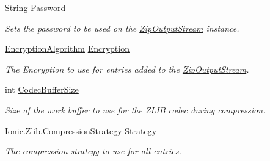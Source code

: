 \begin{DoxyCompactItemize}
\item 
String \mbox{\hyperlink{class_super_tiled2_unity_1_1_ionic_1_1_zip_1_1_zip_output_stream_a574733e2d7d17252b7d89f966d588eb9}{Password}}
\begin{DoxyCompactList}\small\item\em Sets the password to be used on the {\ttfamily \mbox{\hyperlink{class_super_tiled2_unity_1_1_ionic_1_1_zip_1_1_zip_output_stream}{Zip\+Output\+Stream}}} instance. \end{DoxyCompactList}\item 
\mbox{\hyperlink{namespace_super_tiled2_unity_1_1_ionic_1_1_zip_aa3f4e8aa12ef827ac72177a49b4e28e6}{Encryption\+Algorithm}} \mbox{\hyperlink{class_super_tiled2_unity_1_1_ionic_1_1_zip_1_1_zip_output_stream_af1e123174110807666b7c4df62959112}{Encryption}}
\begin{DoxyCompactList}\small\item\em The Encryption to use for entries added to the {\ttfamily \mbox{\hyperlink{class_super_tiled2_unity_1_1_ionic_1_1_zip_1_1_zip_output_stream}{Zip\+Output\+Stream}}}. \end{DoxyCompactList}\item 
int \mbox{\hyperlink{class_super_tiled2_unity_1_1_ionic_1_1_zip_1_1_zip_output_stream_af75e64bdb4e118bc11e39cab569386c5}{Codec\+Buffer\+Size}}
\begin{DoxyCompactList}\small\item\em Size of the work buffer to use for the Z\+L\+IB codec during compression. \end{DoxyCompactList}\item 
\mbox{\hyperlink{namespace_super_tiled2_unity_1_1_ionic_1_1_zlib_abde5c10a1e2ee453e1e8e22e79a39a3b}{Ionic.\+Zlib.\+Compression\+Strategy}} \mbox{\hyperlink{class_super_tiled2_unity_1_1_ionic_1_1_zip_1_1_zip_output_stream_a14669ca8951ced9c7ce418b0e813b77a}{Strategy}}
\begin{DoxyCompactList}\small\item\em The compression strategy to use for all entries. \end{DoxyCompactList}\item 

\end{DoxyCompactItemize}
